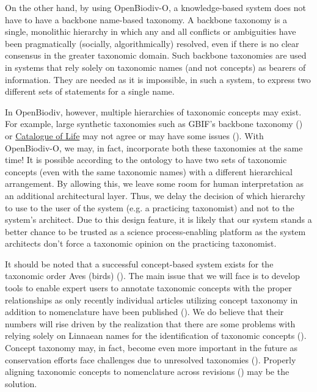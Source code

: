 On the other hand, by using \mbox{OpenBiodiv-O}, a knowledge-based system does not have to have a backbone name-based taxonomy. A backbone taxonomy is a single, monolithic hierarchy in which any and all conflicts or ambiguities have been pragmatically (socially, algorithmically) resolved, even if there is no clear consensus in the greater taxonomic domain. Such backbone taxonomies are used in systems that rely solely on taxonomic names (and not concepts) as bearers of information. They are needed as it is impossible, in such a system, to express two different sets of statements for a single name.

In OpenBiodiv, however, multiple hierarchies of taxonomic concepts may exist. For example, large synthetic taxonomies such as GBIF's backbone taxonomy (\cite{gbif_secretariat_gbif_2017}) or \href{http://www.catalogueoflife.org/}{Catalogue of Life} may not agree or may have some issues (\cite{page_gbif_2012}). With \mbox{OpenBiodiv-O}, we may, in fact, incorporate both these taxonomies at the same time! It is possible according to the ontology to have two sets of taxonomic concepts (even with the same taxonomic names) with a different hierarchical arrangement. By allowing this, we leave some room for human interpretation as an additional architectural layer. Thus, we delay the decision of which hierarchy to use to the user of the system (e.g. a practicing taxonomist) and not to the system's architect. Due to this design feature, it is likely that our system stands a better chance to be trusted as a science process-enabling platform as the system architects don't force a taxonomic opinion on the practicing taxonomist.

It should be noted that a successful concept-based system exists for the taxonomic order Aves (birds) (\cite{lepage_avibase_2014}). The main issue that we will face is to develop tools to enable expert users to annotate taxonomic concepts with the proper relationships as only recently individual articles utilizing concept taxonomy in addition to nomenclature have been published (\cite{franz_two_2016,jansen_phylogenetic_2015,franz_three_2017}). We do believe that their numbers will rise driven by the realization that there are some problems with relying solely on Linnaean names for the identification of taxonomic concepts (\cite{patterson_names_2010,remsen_use_2016, franz_names_2016}). Concept taxonomy may, in fact, become even more important in the future as conservation efforts face challenges due to unresolved taxonomies (\cite{garnett_taxonomy_2017}). Properly aligning taxonomic concepts to nomenclature across revisions (\cite{franz_logic_2016}) may be the solution.

